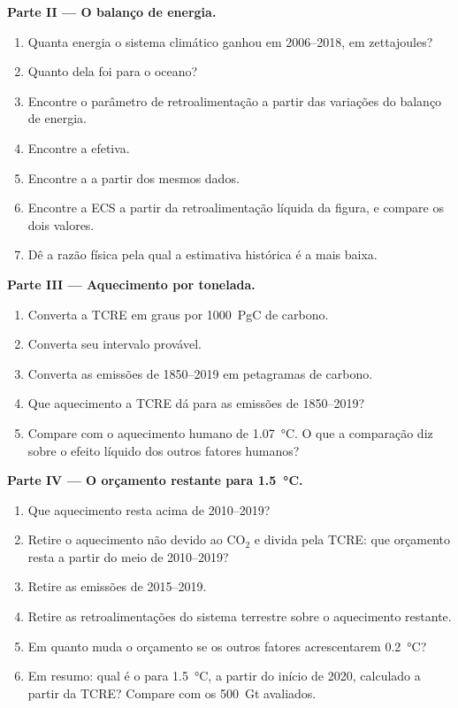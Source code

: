 \begin{problem}
\noindent\textbf{Parte II --- O balanço de energia.}
\begin{enumerate}[resume]
  \item Quanta energia o sistema climático ganhou em 2006--2018, em zettajoules?
  \item Quanto dela foi para o oceano?
  \item Encontre o parâmetro de retroalimentação a partir das variações do balanço de energia.
  \item Encontre a  efetiva.
  \item Encontre a  a partir dos mesmos dados.
  \item Encontre a ECS a partir da retroalimentação líquida da figura, e compare os dois valores.
  \item Dê a razão física pela qual a estimativa histórica é a mais baixa.
\end{enumerate}

\noindent\textbf{Parte III --- Aquecimento por tonelada.}
\begin{enumerate}[resume]
  \item Converta a TCRE em graus por \qty{1000}{PgC} de carbono.
  \item Converta seu intervalo provável.
  \item Converta as emissões de 1850--2019 em petagramas de carbono.
  \item Que aquecimento a TCRE dá para as emissões de 1850--2019?
  \item Compare com o aquecimento humano de \qty{1.07}{\celsius}. O que a comparação diz sobre o
        efeito líquido dos outros fatores humanos?
\end{enumerate}

\noindent\textbf{Parte IV --- O orçamento restante para \qty{1.5}{\celsius}.}
\begin{enumerate}[resume]
  \item Que aquecimento resta acima de 2010--2019?
  \item Retire o aquecimento não devido ao CO$_2$ e divida pela TCRE: que orçamento resta a partir do meio
        de 2010--2019?
  \item Retire as emissões de 2015--2019.
  \item Retire as retroalimentações do sistema terrestre sobre o aquecimento restante.
  \item Em quanto muda o orçamento se os outros fatores acrescentarem \qty{0.2}{\celsius}?
  \item Em resumo: qual é o  para \qty{1.5}{\celsius}, a partir do início de
        2020, calculado a partir da TCRE? Compare com os \qty{500}{Gt} avaliados.
\end{enumerate}
\end{problem}
